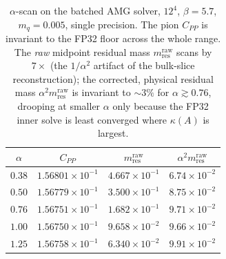 \documentclass[12pt,a4paper]{article}
\newcommand{\Aop}{A}
\begin{document}
\begin{table}[h]
\centering
\begin{tabular}{cccc}
\toprule
$\alpha$ & $C_{PP}$ & $m_{\mathrm{res}}^{\mathrm{raw}}$ & $\alpha^2 m_{\mathrm{res}}^{\mathrm{raw}}$ \\
\midrule
$0.38$ & $1.56801\times10^{-1}$ & $4.667\times10^{-1}$ & $6.74\times10^{-2}$ \\
$0.50$ & $1.56779\times10^{-1}$ & $3.500\times10^{-1}$ & $8.75\times10^{-2}$ \\
$0.76$ & $1.56751\times10^{-1}$ & $1.682\times10^{-1}$ & $9.71\times10^{-2}$ \\
$1.00$ & $1.56750\times10^{-1}$ & $9.658\times10^{-2}$ & $9.66\times10^{-2}$ \\
$1.25$ & $1.56758\times10^{-1}$ & $6.340\times10^{-2}$ & $9.91\times10^{-2}$ \\
\bottomrule
\end{tabular}
\caption{$\alpha$-scan on the batched AMG solver, $12^4$, $\beta=5.7$,
$m_q=0.005$, single precision. The pion $C_{PP}$ is invariant to the FP32 floor
across the whole range. The \emph{raw} midpoint residual mass
$m_{\mathrm{res}}^{\mathrm{raw}}$ scans by $7\times$ (the $1/\alpha^2$ artifact of
the bulk-slice reconstruction); the corrected, physical residual mass
$\alpha^2 m_{\mathrm{res}}^{\mathrm{raw}}$ is invariant to ${\sim}3\%$ for
$\alpha\gtrsim0.76$, drooping at smaller $\alpha$ only because the FP32 inner
solve is least converged where $\kappa(\Aop)$ is largest.}
\label{tab:alpha}
\end{table}
\end{document}
